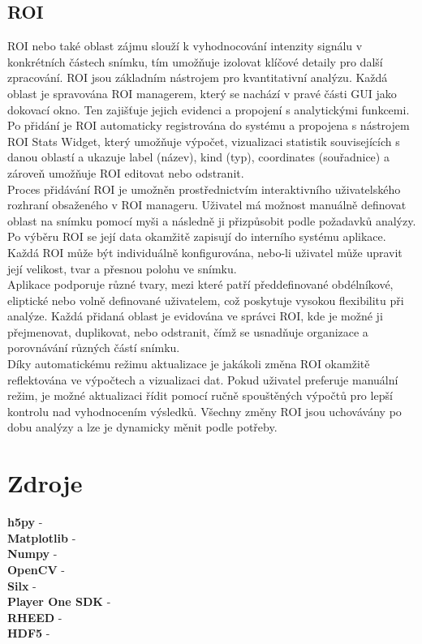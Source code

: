 \documentclass{article}
\begin{document}
\subsection{ROI}
 ROI nebo také oblast zájmu slouží k vyhodnocování intenzity signálu v konkrétních částech snímku, tím umožňuje izolovat klíčové detaily pro další zpracování. ROI jsou základním nástrojem pro kvantitativní analýzu. Každá oblast je spravována ROI managerem, který se nachází v pravé části GUI jako dokovací okno. Ten zajišťuje jejich evidenci a propojení s analytickými funkcemi. Po přidání je ROI automaticky registrována do systému a propojena s nástrojem ROI Stats Widget, který umožňuje výpočet, vizualizaci statistik souvisejících s danou oblastí a ukazuje label (název), kind (typ), coordinates (souřadnice) a zároveň umožňuje ROI editovat nebo odstranit.\\

Proces přidávání ROI je umožněn prostřednictvím interaktivního uživatelského rozhraní obsaženého v ROI manageru. Uživatel má možnost manuálně definovat oblast na snímku pomocí myši a následně ji přizpůsobit podle požadavků analýzy. Po výběru ROI se její data okamžitě zapisují do interního systému aplikace. Každá ROI může být individuálně konfigurována, nebo-li uživatel může upravit její velikost, tvar a přesnou polohu ve snímku.\\

Aplikace podporuje různé tvary, mezi které patří předdefinované obdélníkové, eliptické nebo volně definované uživatelem, což poskytuje vysokou flexibilitu při analýze. Každá přidaná oblast je evidována ve správci ROI, kde je možné ji přejmenovat, duplikovat, nebo odstranit, čímž se usnadňuje organizace a porovnávání různých částí snímku.\\

Díky automatickému režimu aktualizace je jakákoli změna ROI okamžitě reflektována ve výpočtech a vizualizaci dat. Pokud uživatel preferuje manuální režim, je možné aktualizaci řídit pomocí ručně spouštěných výpočtů pro lepší kontrolu nad vyhodnocením výsledků. Všechny změny ROI jsou uchovávány po dobu analýzy a lze je dynamicky měnit podle potřeby.


\newpage
\section{Zdroje}
\textbf{h5py} - \cite{h5pyDocs}\\
\textbf{Matplotlib} - \cite{matplotlibDocs}\\
\textbf{Numpy} - \cite{numpyDocs}\\
\textbf{OpenCV} - \cite{opencvDocs}\\
\textbf{Silx} - \cite{silxDocs}\\
\textbf{Player One SDK} - \cite{PlayerOneSDK}\\
\textbf{RHEED} - \cite{RHEED}\\
\textbf{HDF5} - \cite{WhatIsHDF5}\\
\printbibliography
\end{document}
